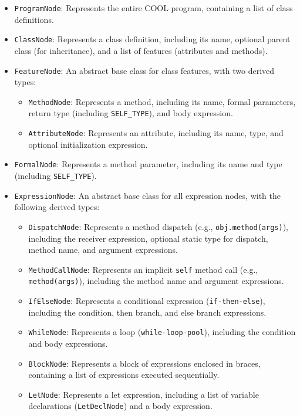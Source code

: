 \documentclass[11pt, titlepage]{article}
\begin{document}
\begin{itemize}[leftmargin=*]
    \item \texttt{ProgramNode}: Represents the entire COOL program, containing a list of class definitions.
    \item \texttt{ClassNode}: Represents a class definition, including its name, optional parent class (for inheritance), and a list of features (attributes and methods).
    \item \texttt{FeatureNode}: An abstract base class for class features, with two derived types:
        \begin{itemize}[leftmargin=*]
            \item \texttt{MethodNode}: Represents a method, including its name, formal parameters, return type (including \texttt{SELF\_TYPE}), and body expression.
            \item \texttt{AttributeNode}: Represents an attribute, including its name, type, and optional initialization expression.
        \end{itemize}
    \item \texttt{FormalNode}: Represents a method parameter, including its name and type (including \texttt{SELF\_TYPE}).
    \item \texttt{ExpressionNode}: An abstract base class for all expression nodes, with the following derived types:
        \begin{itemize}[leftmargin=*]
            \item \texttt{DispatchNode}: Represents a method dispatch (e.g., \texttt{obj.method(args)}), including the receiver expression, optional static type for dispatch, method name, and argument expressions.
            \item \texttt{MethodCallNode}: Represents an implicit \texttt{self} method call (e.g., \texttt{method(args)}), including the method name and argument expressions.
            \item \texttt{IfElseNode}: Represents a conditional expression (\texttt{if-then-else}), including the condition, then branch, and else branch expressions.
            \item \texttt{WhileNode}: Represents a loop (\texttt{while-loop-pool}), including the condition and body expressions.
            \item \texttt{BlockNode}: Represents a block of expressions enclosed in braces, containing a list of expressions executed sequentially.
            \item \texttt{LetNode}: Represents a let expression, including a list of variable declarations (\texttt{LetDeclNode}) and a body expression.

\end{itemize}
\end{itemize}
\end{document}
